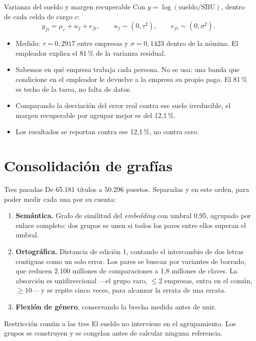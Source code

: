 \documentclass[11pt]{beamer}
\begin{document}
\begin{frame}{Varianza del sueldo y margen recuperable}
Con $y = \log(\text{sueldo}/\text{SBU})$, dentro de cada celda de cargo $c$:
\begin{equation*}
y_{fi} = \mu_c + u_f + e_{fi}, \qquad
u_f \sim (0, \tau^2), \qquad e_{fi} \sim (0, \sigma^2).
\end{equation*}
\begin{itemize}
\item Medido: $\tau = 0{,}2917$ entre empresas y $\sigma = 0{,}1423$ dentro de
la nómina. El empleador explica el \alert{81\,\%} de la varianza residual.
\item Sabemos en qué empresa trabaja cada persona. No se usa: una banda que
condicione en el empleador le devuelve a la empresa su propio pago. El 81\,\%
es techo de la tarea, no falta de datos.
\item Comparando la desviación del error real contra ese suelo irreducible, el
margen recuperable por agrupar mejor es del \alert{12,1\,\%}.
\item Los resultados se reportan contra ese 12,1\,\%, no contra cero.
\end{itemize}
\end{frame}

\section{Consolidación de grafías}

\begin{frame}{Tres pasadas}
De 65.181 títulos a \alert{50.296} puestos. Separadas y en este orden, para poder
medir cada una por su cuenta:
\begin{enumerate}
\item \textbf{Semántica.} Grafo de similitud del \textit{embedding} con umbral
0,95, agrupado por \alert{enlace completo}: dos grupos se unen si todos los pares
entre ellos superan el umbral.
\item \textbf{Ortográfica.} Distancia de edición 1, contando el intercambio de
dos letras contiguas como un solo error. Los pares se buscan por variantes de
borrado, que reducen 2.100 millones de comparaciones a 1,8 millones de claves. La
absorción es \alert{unidireccional} ---el grupo raro, $\le 2$ empresas, entra en
el común, $\ge 10$--- y se repite cinco veces, para alcanzar la errata de una
errata.
\item \textbf{Flexión de género}, conservando la brecha medida antes de unir.
\end{enumerate}
\medskip
\begin{block}{Restricción común a las tres}
El sueldo no interviene en el agrupamiento. Los grupos se construyen y se
congelan antes de calcular ninguna referencia.
\end{block}
\end{frame}
\end{document}
